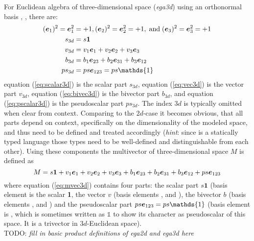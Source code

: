 For Euclidean algebra of three-dimensional space (\emph{ega3d}) using an orthonormal basis
, ,  there are:
\begin{subequations}
    \begin{align}
        (\bv{1})^2 = \bv{1}^2 & = +1, (\bv{2})^2 = \bv{2}^2 = +1,
        \;\text{and}\; (\bv{3})^2 = \bv{3}^2 = +1
        \label{eq:ega3d_base_vec} \\ 
        s_{3d} & = s\bm{1}
        \label{eq:scalar3d} \\
        v_{3d} & = v_1\bv{1} + v_2\bv{2} + v_3\bv{3} 
        \label{eq:vec3d} \\ 
        b_{3d} & = b_1\bv{23} + b_2\bv{31} + b_3\bv{12} 
        \label{eq:bivec3d} \\ 
        ps_{3d} & = ps \bv{123}  = ps\mathds{1}
        \label{eq:pscalar3d}
    \end{align}
\end{subequations}
equation (\ref{eq:scalar3d}) is the scalar part $s_{3d}$, equation (\ref{eq:vec3d}) is the
vector part $v_{3d}$, equation (\ref{eq:bivec3d}) is the bivector part $b_{3d}$, and
equation (\ref{eq:pscalar3d}) is the pseudoscalar part $ps_{3d}$. The index $3d$ is
typically omitted when clear from context. Comparing to the $2d$-case it becomes obvious,
that all parts depend on context, specifically on the dimensionality of the modeled space,
and thus need to be defined and treated accordingly (\emph{hint}: since \Cpp is a
statically typed language those types need to be well-defined and distinguishable from
each other). Using these components the multivector of three-dimensional space $M$ is
defined as
\begin{equation}
    M = s \bm{1} + v_1\bm{e}_{1} + v_2\bm{e}_{2} + v_3\bm{e}_{3} 
    + b_1\bm{e}_{23} + b_2\bm{e}_{31} + b_3\bm{e}_{12} + ps\bm{e}_{123}
    \label{eq:mvec3d}  
\end{equation}
where equation (\ref{eq:mvec3d}) contains four parts: the scalar part $s\bm{1}$ (basis
element is the scalar \textbf{1}, the vector $v$ (basis elements ,  and
), the bivector $b$ (basis elements ,  and ) and the
pseudoscalar part $ps \bv{123} = ps \mathds{1}$ (basis element is , which is
sometimes written as $\mathds{1}$ to show its character as pseudoscalar of this space. It
is a trivector in $3d$-Euclidean space). \\

TODO: \emph{fill in basic product definitions of ega2d and ega3d here} \\

